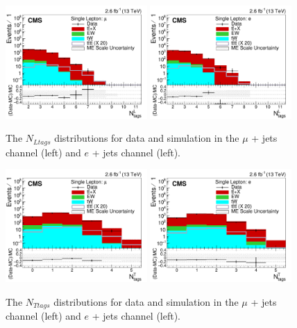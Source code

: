\begin{figure}[ht!]
    \includegraphics[width=0.48\textwidth]{images/Run2/nLtags_StackLogY.pdf}
    \includegraphics[width=0.48\textwidth]{images/Run2/nLtags_StackLogY_e.pdf}
    \caption{The $N_{Ltags}$ distributions for data and simulation in the $\mu$ + jets channel (left) and $e$ + jets channel (left).}
    \label{fig:nLtagsInc}
\end{figure}

\begin{figure}[ht!]
    \includegraphics[width=0.48\textwidth]{images/Run2/nTtags_StackLogY.pdf}
    \includegraphics[width=0.48\textwidth]{images/Run2/nTtags_StackLogY_e.pdf}
    \caption{The $N_{Ttags}$ distributions for data and simulation in the $\mu$ + jets channel (left) and $e$ + jets channel (left).}
    \label{fig:nTtagsInc}
\end{figure}

